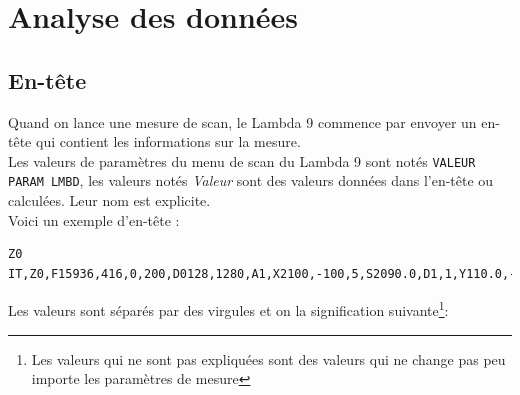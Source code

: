 \documentclass[a4paper, 12pt]{article}
\begin{document}
\newpage
\section{Analyse des données}\label{analyse}

\subsection{En-tête}\label{en-tete}

Quand on lance une mesure de scan, le Lambda 9 commence par envoyer un en-tête qui contient les informations sur la mesure.\\
Les valeurs de paramètres du menu de scan du Lambda 9 sont notés \verb|VALEUR PARAM LMBD|, les valeurs notés \emph{Valeur} sont des valeurs données dans l'en-tête ou calculées.
Leur nom est explicite.\\
Voici un exemple d'en-tête :
\begin{lstlisting}
Z0
IT,Z0,F15936,416,0,200,D0128,1280,A1,X2100,-100,5,S2090.0,D1,1,Y110.0,-22.000,4,Z0,D0128,1280,L1
\end{lstlisting}
Les valeurs sont séparés par des virgules et on la signification suivante\footnote{Les valeurs qui ne sont pas expliquées sont des valeurs qui ne change pas peu importe les paramètres de mesure}:
\end{document}
